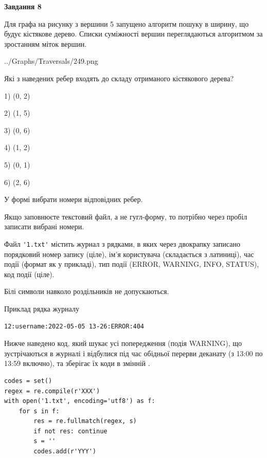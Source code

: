 \documentclass[12pt, ukrainian]{article}
\def\code#1{\Verb!#1!}
\begin{document}
{\begin {large}
{\begin {center}\textbf{Завдання 8}\end {center}}\par
Для графа на рисунку з вершини 5 запущено алгоритм пошуку в ширину, що будує кістякове дерево. Списки суміжності вершин переглядаються алгоритмом за зростанням міток вершин.\par
\begin{center}
	{../Graphs/Traversals/249.png}
\end{center}
\par Які з наведених ребер входять до складу отриманого кістякового дерева?\par
1) (0, 2)\par
2) (1, 5)\par
3) (0, 6)\par
4) (1, 2)\par
5) (0, 1)\par
6) (2, 6)\par
{\vskip 15pt} У формі вибрати номери відповідних ребер.


Якщо заповнюєте текстовий файл, а не гугл-форму, то потрібно через пробіл записа\-ти вибрані номери.\par
\newpage


Файл \code{'1.txt'} містить журнал з рядками, в яких через двокрапку записано поряд\-ко\-вий номер запису (ціле), ім'я користувача (складається з латиниці), час події (фор\-мат як у прикладі), тип події (ERROR, WARNING, INFO, STATUS), код події (ціле).

Білі символи навколо роздільників не допускаються.

Приклад рядка журналу



\begin{verbatim}
12:username:2022-05-05 13-26:ERROR:404
\end{verbatim}


Нижче наведено код, який шукає усі попередження (подія WARNING), що зустрі\-ча\-ються в журналі і відбулися під час обідньої перерви деканату (з 13:00 по 13:59 включно), та зберігає їх коди в змінній .



\begin{verbatim}
codes = set()
regex = re.compile(r'XXX')
with open('1.txt', encoding='utf8') as f:
    for s in f:
        res = re.fullmatch(regex, s)
        if not res: continue
        s = ''
        codes.add(r'YYY')
\end{verbatim}





\end{large}}
\end{document}
